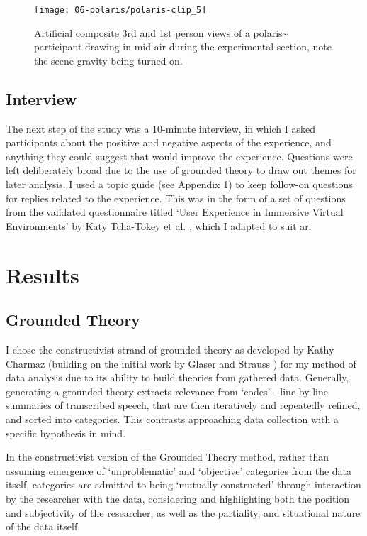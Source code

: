 \begin{figure}[ht]
    \centering
    \texttt{[image: 06-polaris/polaris-clip\_5]}
    \captionsetup{justification=centering,margin=1.5cm}
    \caption{Artificial composite 3rd and 1st person views of a polaris\textasciitilde{} participant drawing in mid air during the experimental section, note the scene gravity being turned on.  \citep[from][\href{https://youtu.be/72JLG1fGboY}{at 0:00}]{bilbow2022}}\label{fig: polaris-clip_5}
\end{figure}

\subsection{Interview}\label{sec: polaris-study-interview}
The next step of the study was a 10-minute interview, in which I asked participants about the positive and negative aspects of the experience, and anything they could suggest that would improve the experience. Questions were left deliberately broad due to the use of grounded theory to draw out themes for later analysis. I used a topic guide (see Appendix 1) to keep follow-on questions for replies related to the experience. This was in the form of a set of questions from the validated questionnaire titled `User Experience in Immersive Virtual Environments' by Katy Tcha-Tokey et al. \citeyearpar{tcha-tokey2016a}, which I adapted to suit \gls{ar}.

\section{Results}\label{sec: polaris-feedback}
\subsection{Grounded Theory}\label{sec: polaris-feedback-grounded}
I chose the constructivist strand of grounded theory as developed by Kathy Charmaz \citeyearpar{charmaz2006} (building on the initial work by Glaser and Strauss \citeyearpar{glaser1967}) for my method of data analysis due to its ability to build theories from gathered data. Generally, generating a grounded theory extracts relevance from `codes' - line-by-line summaries of transcribed speech, that are then iteratively and repeatedly refined, and sorted into categories. This contrasts approaching data collection with a specific hypothesis in mind.

In the constructivist version of the Grounded Theory method, rather than assuming emergence of `unproblematic' and `objective' categories from the data itself, categories are admitted to being `mutually constructed' through interaction by the researcher with the data, considering and highlighting both the position and subjectivity of the researcher, as well as the partiality, and situational nature of the data itself.

